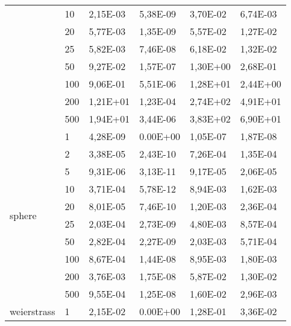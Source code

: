 \begin{longtable}[c]{|p{3.5cm}|l|l|l|l|l|}
                                       & 10        & 2,15E-03 & 5,38E-09 & 3,70E-02 & 6,74E-03 \\ \cline{2-6} 
                                       & 20        & 5,77E-03 & 1,35E-09 & 5,57E-02 & 1,27E-02 \\ \cline{2-6} 
                                       & 25        & 5,82E-03 & 7,46E-08 & 6,18E-02 & 1,32E-02 \\ \cline{2-6} 
                                       & 50        & 9,27E-02 & 1,57E-07 & 1,30E+00 & 2,68E-01 \\ \cline{2-6} 
                                       & 100       & 9,06E-01 & 5,51E-06 & 1,28E+01 & 2,44E+00 \\ \cline{2-6} 
                                       & 200       & 1,21E+01 & 1,23E-04 & 2,74E+02 & 4,91E+01 \\ \cline{2-6} 
                                       & 500       & 1,94E+01 & 3,44E-06 & 3,83E+02 & 6,90E+01 \\ \hline
\multirow[t]{10}{*}{sphere}               & 1         & 4,28E-09 & 0.00E+00 & 1,05E-07 & 1,87E-08 \\ \cline{2-6} 
                                       & 2         & 3,38E-05 & 2,43E-10 & 7,26E-04 & 1,35E-04 \\ \cline{2-6} 
                                       & 5         & 9,31E-06 & 3,13E-11 & 9,17E-05 & 2,06E-05 \\ \cline{2-6} 
                                       & 10        & 3,71E-04 & 5,78E-12 & 8,94E-03 & 1,62E-03 \\ \cline{2-6} 
                                       & 20        & 8,01E-05 & 7,46E-10 & 1,20E-03 & 2,36E-04 \\ \cline{2-6} 
                                       & 25        & 2,03E-04 & 2,73E-09 & 4,80E-03 & 8,57E-04 \\ \cline{2-6} 
                                       & 50        & 2,82E-04 & 2,27E-09 & 2,03E-03 & 5,71E-04 \\ \cline{2-6} 
                                       & 100       & 8,67E-04 & 1,44E-08 & 8,95E-03 & 1,80E-03 \\ \cline{2-6} 
                                       & 200       & 3,76E-03 & 1,75E-08 & 5,87E-02 & 1,30E-02 \\ \cline{2-6} 
                                       & 500       & 9,55E-04 & 1,25E-08 & 1,60E-02 & 2,96E-03 \\ \hline
\multirow[t]{10}{*}{weierstrass}          & 1         & 2,15E-02 & 0.00E+00 & 1,28E-01 & 3,36E-02 \\ \cline{2-6} 

\end{longtable}
